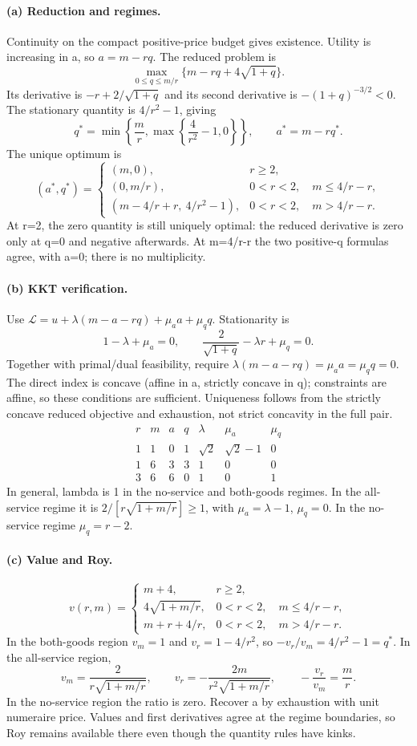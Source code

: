 \documentclass[11pt,a4paper]{article}
\begin{document}
\paragraph{(a) Reduction and regimes.}
Continuity on the compact positive-price budget gives existence. Utility is increasing in a, so $a=m-rq$. The reduced problem is
\[
 \max_{0\le q\le m/r}\{m-rq+4\sqrt{1+q}\}.
\]
Its derivative is $-r+2/\sqrt{1+q}$ and its second derivative is $-(1+q)^{-3/2}<0$. The stationary quantity is $4/r^2-1$, giving
\[
 q^*=\min\left\{\frac mr,\max\left\{\frac4{r^2}-1,0\right\}\right\},\qquad a^*=m-rq^*.
\]
The unique optimum is
\[
 (a^*,q^*)=
 \begin{cases}
 (m,0),&r\ge2,\\
 (0,m/r),&0<r<2,\quad m\le4/r-r,\\
 (m-4/r+r,\ 4/r^2-1),&0<r<2,\quad m>4/r-r.
 \end{cases}
\]
At r=2, the zero quantity is still uniquely optimal: the reduced derivative is zero only at q=0 and negative afterwards. At m=4/r-r the two positive-q formulas agree, with a=0; there is no multiplicity.
\paragraph{(b) KKT verification.}
Use $\mathcal L=u+\lambda(m-a-rq)+\mu_a a+\mu_q q$. Stationarity is
\[
 1-\lambda+\mu_a=0,\qquad
 \frac2{\sqrt{1+q}}-\lambda r+\mu_q=0.
\]
Together with primal/dual feasibility, require $\lambda(m-a-rq)=\mu_a a=\mu_q q=0$. The direct index is concave (affine in a, strictly concave in q); constraints are affine, so these conditions are sufficient. Uniqueness follows from the strictly concave reduced objective and exhaustion, not strict concavity in the full pair.
\[
 \begin{array}{cc|ccccc}
 r&m&a&q&\lambda&\mu_a&\mu_q\\\hline
 1&1&0&1&\sqrt2&\sqrt2-1&0\\
 1&6&3&3&1&0&0\\
 3&6&6&0&1&0&1
 \end{array}
\]
In general, lambda is 1 in the no-service and both-goods regimes. In the all-service regime it is $2/[r\sqrt{1+m/r}]\ge1$, with $\mu_a=\lambda-1$, $\mu_q=0$. In the no-service regime $\mu_q=r-2$.
\paragraph{(c) Value and Roy.}
\[
 v(r,m)=\begin{cases}
 m+4,&r\ge2,\\
 4\sqrt{1+m/r},&0<r<2,\quad m\le4/r-r,\\
 m+r+4/r,&0<r<2,\quad m>4/r-r.
 \end{cases}
\]
In the both-goods region $v_m=1$ and $v_r=1-4/r^2$, so $-v_r/v_m=4/r^2-1=q^*$. In the all-service region,
\[
 v_m=\frac2{r\sqrt{1+m/r}},\qquad
 v_r=-\frac{2m}{r^2\sqrt{1+m/r}},\qquad
 -\frac{v_r}{v_m}=\frac mr.
\]
In the no-service region the ratio is zero. Recover a by exhaustion with unit numeraire price. Values and first derivatives agree at the regime boundaries, so Roy remains available there even though the quantity rules have kinks.
\end{document}
